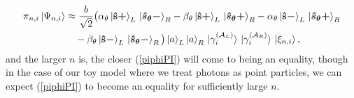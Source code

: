 \begin{equation}\label{piphiPI}
	\begin{split}
		\pi_{n,i}\ket{\Psi_{n,i}}&\approx\frac{b}{\sqrt{2}}\big(\alpha_\theta\ket*{\vb{\hat{{s}}}\bm{+}}_L\ket*{\bm{\hat{s}_\theta-}}_R
		-\beta_\theta\ket*{\vb{\hat{{s}}}\bm{+}}_L\ket*{\bm{\hat{s}_\theta+}}_R-\alpha_\theta\ket*{\vb{\hat{{s}}}\bm{-}}_L\ket*{\bm{\hat{s}_\theta+}}_R\\
		&\quad
		-\beta_\theta\ket*{\vb{\hat{{s}}}\bm{-}}_L\ket*{\bm{\hat{s}_\theta-}}_R\big)\ket{a}_L\ket{a}_R\ket*{\gamma_i^{(\mathcal{A}_L)}}\ket*{\gamma_i^{(\mathcal{A}_R)}}\ket*{\xi_{n,i}},
		\end{split}
\end{equation}
and the larger $n$ is, the closer (\ref{piphiPI}) will come to being an equality, though in the case of our toy model where we treat photons as point particles, we can expect (\ref{piphiPI}) to become an equality for sufficiently large $n$.



